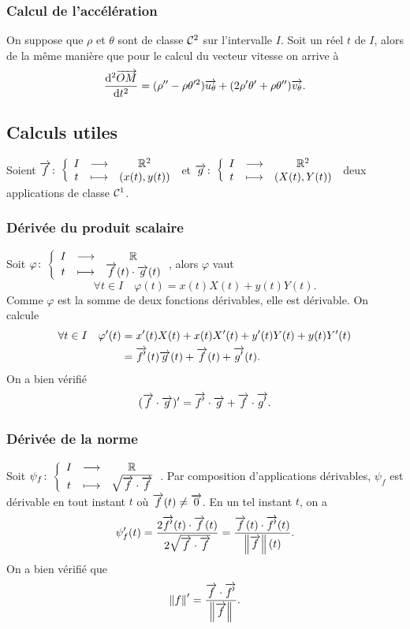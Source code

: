 \subsubsection{Calcul de l'accélération}
On suppose que $\rho$ et $\theta$ sont de classe $\mathcal{C}^{2}$ sur l'intervalle $I$. Soit un réel $t$ de $I$, alors de la même manière que pour le calcul du vecteur vitesse on arrive à
\begin{equation}
  \dfrac{\mathrm{d}^2 \overrightarrow{OM}}{\mathrm{d} {t}^2}=(\rho''-\rho\theta'^2)\overrightarrow{u_\theta} + (2\rho'\theta'+\rho\theta'')\overrightarrow{v_\theta}.
\end{equation}

\subsection{Calculs utiles}
Soient $\overrightarrow{f}\colon \left\{\begin{array}{ccc} I & \longrightarrow &\mathbb{R}^2\\ t & \longmapsto & (x(t),y(t)) \end{array} \right.$ et $\overrightarrow{g}\colon \left\{\begin{array}{ccc} I & \longrightarrow &\mathbb{R}^2\\ t & \longmapsto & (X(t),Y(t)) \end{array} \right.$ deux applications de classe $\mathcal{C}^{1}$.

\subsubsection{Dérivée du produit scalaire}
Soit $\varphi\colon \left\{\begin{array}{ccc} I & \longrightarrow &\mathbb{R}\\ t & \longmapsto & \overrightarrow{f}(t) \cdot \overrightarrow{g}(t) \end{array} \right.$, alors $\varphi$ vaut
\begin{equation}
  \forall t \in I \quad \varphi(t)=x(t)X(t)+y(t)Y(t).
\end{equation}
Comme $\varphi$ est la somme de deux fonctions dérivables, elle est dérivable. On calcule
\begin{align}
  \forall t \in I \quad \varphi'(t)&=x'(t)X(t)+x(t)X'(t)+y'(t)Y(t)+y(t)Y'(t)\\
  &=\overrightarrow{f'}(t)\overrightarrow{g}(t)+\overrightarrow{f}(t)+\overrightarrow{g'}(t).
\end{align}
On a bien vérifié
\begin{equation}
  (\overrightarrow{f} \cdot \overrightarrow{g})'=\overrightarrow{f'} \cdot \overrightarrow{g} + \overrightarrow{f} \cdot \overrightarrow{g'}.
\end{equation}

\subsubsection{Dérivée de la norme}
Soit $\psi_f\colon \left\{\begin{array}{ccc} I & \longrightarrow &\mathbb{R}\\ t & \longmapsto & \sqrt{\overrightarrow{f} \cdot \overrightarrow{f}} \end{array} \right.$. Par composition d'applications dérivables, $\psi_f$ est dérivable en tout instant $t$ où $\overrightarrow{f}(t) \neq \overrightarrow{0}$. En un tel instant $t$, on a
\begin{equation}
  \psi_f'(t)=\frac{2 \overrightarrow{f'}(t)\cdot\overrightarrow{f}(t)}{2 \sqrt{\overrightarrow{f} \cdot \overrightarrow{f}}}=\frac{\overrightarrow{f}(t)\cdot\overrightarrow{f'}(t)}{\left\lVert\overrightarrow{f}\right\rVert(t)}.
\end{equation}
On a bien vérifié que
\begin{equation}
 \left\lVert f\right\rVert'=\frac{\overrightarrow{f} \cdot \overrightarrow{f'}}{\left\lVert\overrightarrow{f}\right\rVert}.
\end{equation}

